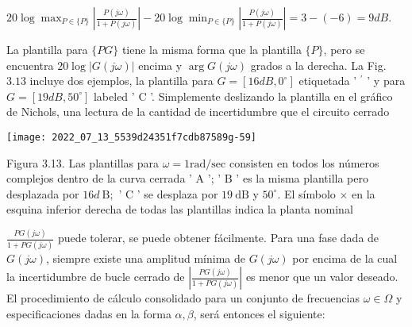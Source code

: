 $20 \log \max _{P \in\{P\}}\left|\frac{P(j \omega)}{1+P(j \omega)}\right|-20 \log \min _{P \in\{P\}}\left|\frac{P(j \omega)}{1+P(j \omega)}\right|=3-(-6)=9 d B .$

La plantilla para $\{P G\}$ tiene la misma forma que la plantilla $\{P\}$, pero se encuentra $20 \log | G(j \omega)|$ encima y $\arg G(j \omega)$ grados a la derecha. La Fig. $3.13$ incluye dos ejemplos, la plantilla para $G=\left[16 d B, 0^{\circ}\right]$ etiquetada ' ${ }^{\prime}$ ' y para $G=\left[19 d B, 50^{\circ}\right]$ labeled ' $\mathrm{C}$ '. Simplemente deslizando la plantilla en el gráfico de Nichols, una lectura de la cantidad de incertidumbre que el circuito cerrado

\texttt{[image: 2022\_07\_13\_5539d24351f7cdb87589g-59]}

Figura 3.13. Las plantillas para $\omega=1 \mathrm{rad} / \mathrm{sec}$ consisten en todos los números complejos dentro de la curva cerrada ' $\mathrm{A}$ '; ' $\mathrm{B}$ ' es la misma plantilla pero desplazada por $16 d \mathrm{~B} ;$ ' $\mathrm{C}$ ' se desplaza por $19 \mathrm{~dB}$ y $50^{\circ}$. El símbolo $\times$ en la esquina inferior derecha de todas las plantillas indica la planta nominal

$\frac{P G(j \omega)}{1+P G(j \omega)}$ puede tolerar, se puede obtener fácilmente. Para una fase dada de $G(j \omega)$, siempre existe una amplitud mínima de $G(j \omega)$ por encima de la cual la incertidumbre de bucle cerrado de $\left|\frac{P G(j \omega)}{1+P G(j \omega)}\right|$ es menor que un valor deseado. El procedimiento de cálculo consolidado para un conjunto de frecuencias $\omega \in \Omega$ y especificaciones dadas en la forma $\alpha, \beta$, será entonces el siguiente:

